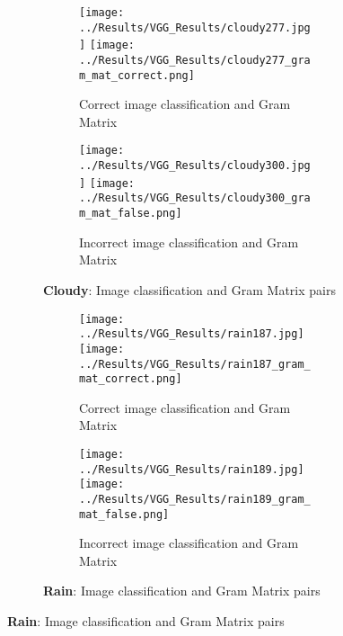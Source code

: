 \documentclass{article}
\begin{document}
\begin{figure}[H]
    \centering
    
    \begin{subfigure}{\linewidth}
        \centering
        \begin{subfigure}{0.49\linewidth}
            \centering
            \texttt{[image: ../Results/VGG\_Results/cloudy277.jpg]}
            \texttt{[image: ../Results/VGG\_Results/cloudy277\_gram\_mat\_correct.png]}
            \caption*{Correct image classification and Gram Matrix}
        \end{subfigure}
        \begin{subfigure}{0.49\linewidth}
            \centering
            \texttt{[image: ../Results/VGG\_Results/cloudy300.jpg]}
            \texttt{[image: ../Results/VGG\_Results/cloudy300\_gram\_mat\_false.png]}
            \caption*{Incorrect image classification and Gram Matrix}
        \end{subfigure}
        \caption*{\textbf{Cloudy}: Image classification and Gram Matrix pairs}
    \end{subfigure}
    \hfill

    \begin{subfigure}{\linewidth}
        \centering
        \begin{subfigure}{0.49\linewidth}
            \centering
            \texttt{[image: ../Results/VGG\_Results/rain187.jpg]}
            \texttt{[image: ../Results/VGG\_Results/rain187\_gram\_mat\_correct.png]}
            \caption*{Correct image classification and Gram Matrix}
        \end{subfigure}
        \begin{subfigure}{0.49\linewidth}
            \centering
            \texttt{[image: ../Results/VGG\_Results/rain189.jpg]}
            \texttt{[image: ../Results/VGG\_Results/rain189\_gram\_mat\_false.png]}
            \caption*{Incorrect image classification and Gram Matrix}
        \end{subfigure}
        \caption*{\textbf{Rain}: Image classification and Gram Matrix pairs}
    \end{subfigure}
    \hfill


\end{figure}
\end{document}
